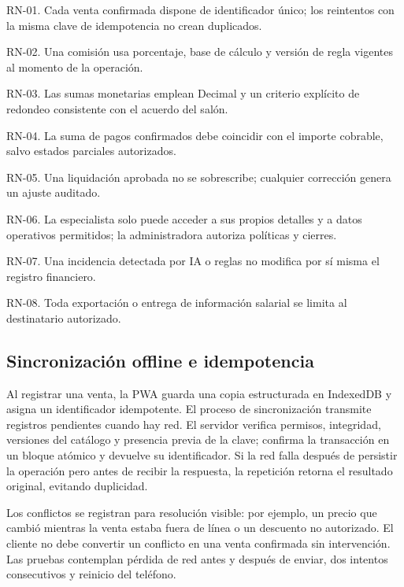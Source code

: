 \begin{vinetas}
\item RN-01. Cada venta confirmada dispone de identificador único; los reintentos con la misma clave de idempotencia no crean duplicados.
\item RN-02. Una comisión usa porcentaje, base de cálculo y versión de regla vigentes al momento de la operación.
\item RN-03. Las sumas monetarias emplean Decimal y un criterio explícito de redondeo consistente con el acuerdo del salón.
\item RN-04. La suma de pagos confirmados debe coincidir con el importe cobrable, salvo estados parciales autorizados.
\item RN-05. Una liquidación aprobada no se sobrescribe; cualquier corrección genera un ajuste auditado.
\item RN-06. La especialista solo puede acceder a sus propios detalles y a datos operativos permitidos; la administradora autoriza políticas y cierres.
\item RN-07. Una incidencia detectada por IA o reglas no modifica por sí misma el registro financiero.
\item RN-08. Toda exportación o entrega de información salarial se limita al destinatario autorizado.
\end{vinetas}

\subsection{Sincronización offline e idempotencia}

Al registrar una venta, la PWA guarda una copia estructurada en IndexedDB y asigna un identificador idempotente. El proceso de sincronización transmite registros pendientes cuando hay red. El servidor verifica permisos, integridad, versiones del catálogo y presencia previa de la clave; confirma la transacción en un bloque atómico y devuelve su identificador. Si la red falla después de persistir la operación pero antes de recibir la respuesta, la repetición retorna el resultado original, evitando duplicidad.


Los conflictos se registran para resolución visible: por ejemplo, un precio que cambió mientras la venta estaba fuera de línea o un descuento no autorizado. El cliente no debe convertir un conflicto en una venta confirmada sin intervención. Las pruebas contemplan pérdida de red antes y después de enviar, dos intentos consecutivos y reinicio del teléfono.



